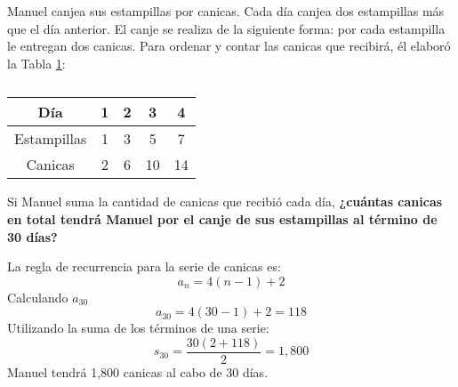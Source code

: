 Manuel canjea sus estampillas por canicas. Cada día canjea dos estampillas más que el día anterior.
El canje se realiza de la siguiente forma: por cada estampilla le entregan dos canicas.
Para ordenar y contar las canicas que recibirá, él elaboró la Tabla \ref{tab:estampillas}:

\begin{table}[H]
    \centering
    \caption{}
    \label{tab:estampillas}
    \begin{tabular}{c|c|c|c|c}
        Día         & 1 & 2 & 3  & 4  \\ \hline
        Estampillas & 1 & 3 & 5  & 7  \\ \hline
        Canicas     & 2 & 6 & 10 & 14
    \end{tabular}
\end{table}

Si Manuel suma la cantidad de canicas que recibió cada día,
\textbf{¿cuántas canicas en total tendrá Manuel por el canje de sus estampillas al término de 30 días?}\\

\begin{solutionbox}{5.5cm}
    La regla de recurrencia para la serie de canicas es:
    \[a_n=4(n-1)+2\]
    Calculando $a_{30}$
    \[a_{30}=4(30-1)+2=118\]
    Utilizando la suma de los términos de una serie:
    \[s_{30}=\dfrac{30(2+118)}{2}=1,800\]
    Manuel tendrá 1,800 canicas al cabo de 30 días.
\end{solutionbox}
